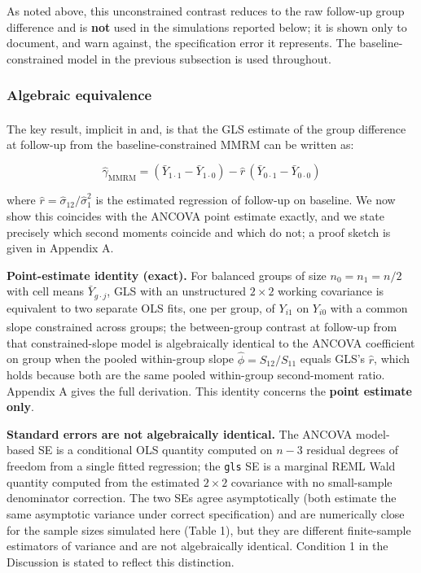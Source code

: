 \documentclass[
  11pt,
]{article}
\begin{document}
As noted above, this unconstrained contrast reduces to
the raw follow-up group difference and is \textbf{not} used in
the simulations reported below; it is shown only to
document, and warn against, the specification error it
represents. The baseline-constrained model in the
previous subsection is used throughout.

\subsubsection{Algebraic equivalence}\label{algebraic-equivalence}

The key result, implicit in\textsuperscript{} and\textsuperscript{}, is that the GLS estimate of the
group difference at follow-up from the baseline-constrained
MMRM can be written as:

\[
\hat{\gamma}_{\mathrm{MMRM}} =
(\bar{Y}_{1 \cdot 1} - \bar{Y}_{1 \cdot 0}) -
\hat{r}\,(\bar{Y}_{0 \cdot 1} - \bar{Y}_{0 \cdot 0})
\]

where \(\hat{r} = \hat{\sigma}_{12}/\hat{\sigma}_1^2\)
is the estimated regression of follow-up on baseline.
We now show this coincides with the ANCOVA point
estimate exactly, and we state precisely which second
moments coincide and which do not; a proof sketch is
given in Appendix A.

\textbf{Point-estimate identity (exact).} For balanced
groups of size \(n_0 = n_1 = n/2\) with cell means
\(\bar{Y}_{g \cdot j}\), GLS with an unstructured \(2
\times 2\) working covariance is equivalent to two
separate OLS fits, one per group, of \(Y_{i1}\) on
\(Y_{i0}\) with a common slope constrained across groups\textsuperscript{}; the between-group contrast
at follow-up from that constrained-slope model is
algebraically identical to the ANCOVA coefficient on
group when the pooled within-group slope
\(\hat{\phi} = S_{12}/S_{11}\) equals GLS's \(\hat{r}\),
which holds because both are the same pooled
within-group second-moment ratio. Appendix A gives the
full derivation. This identity concerns the \textbf{point
estimate only}.

\textbf{Standard errors are not algebraically identical.}
The ANCOVA model-based SE is a conditional OLS quantity
computed on \(n - 3\) residual degrees of freedom from a
single fitted regression; the \texttt{gls} SE is a marginal
REML Wald quantity computed from the estimated \(2
\times 2\) covariance with no small-sample denominator
correction. The two SEs agree asymptotically (both
estimate the same asymptotic variance under correct
specification) and are numerically close for the
sample sizes simulated here (Table 1), but they are
different finite-sample estimators of variance and are
not algebraically identical. Condition 1 in the
Discussion is stated to reflect this distinction.
\end{document}
